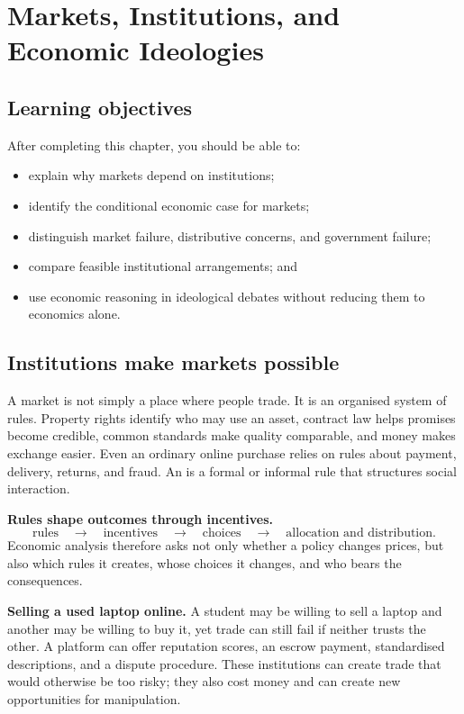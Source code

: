 \chapter{Markets, Institutions, and Economic Ideologies}
\label{chap:ideologies}

\section{Learning objectives}

After completing this chapter, you should be able to:
\begin{itemize}
  \item explain why markets depend on institutions;
  \item identify the conditional economic case for markets;
  \item distinguish market failure, distributive concerns, and government failure;
  \item compare feasible institutional arrangements; and
  \item use economic reasoning in ideological debates without reducing them to economics alone.
\end{itemize}

\section{Institutions make markets possible}

A market is not simply a place where people trade. It is an organised system
of rules. Property rights identify who may use an asset, contract law helps
promises become credible, common standards make quality comparable, and money
makes exchange easier. Even an ordinary online purchase relies on rules about
payment, delivery, returns, and fraud. An  is a formal
or informal rule that structures social interaction.

\begin{keyidea}
\textbf{Rules shape outcomes through incentives.}
\[
\text{rules}
\quad\longrightarrow\quad
\text{incentives}
\quad\longrightarrow\quad
\text{choices}
\quad\longrightarrow\quad
\text{allocation and distribution}.
\]
Economic analysis therefore asks not only whether a policy changes prices, but
also which rules it creates, whose choices it changes, and who bears the
consequences.
\end{keyidea}

\begin{exercisebox}
\textbf{Selling a used laptop online.}
A student may be willing to sell a laptop and another may be willing to buy
it, yet trade can still fail if neither trusts the other. A platform can offer
reputation scores, an escrow payment, standardised descriptions, and a dispute
procedure. These institutions can create trade that would otherwise be too
risky; they also cost money and can create new opportunities for manipulation.
\end{exercisebox}

